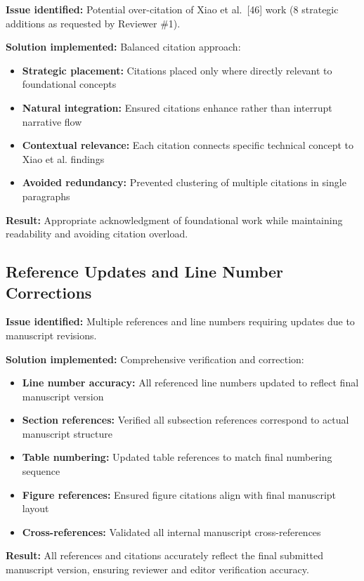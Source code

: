 \documentclass[11pt,a4paper]{article}
\begin{document}
\textbf{Issue identified:} Potential over-citation of Xiao et al.~[46] work (8 strategic additions as requested by Reviewer \#1).

\textbf{Solution implemented:} Balanced citation approach:
\begin{itemize}
    \item \textbf{Strategic placement:} Citations placed only where directly relevant to foundational concepts
    \item \textbf{Natural integration:} Ensured citations enhance rather than interrupt narrative flow
    \item \textbf{Contextual relevance:} Each citation connects specific technical concept to Xiao et al. findings
    \item \textbf{Avoided redundancy:} Prevented clustering of multiple citations in single paragraphs
\end{itemize}

\textbf{Result:} Appropriate acknowledgment of foundational work while maintaining readability and avoiding citation overload.

\subsection*{Reference Updates and Line Number Corrections}

\textbf{Issue identified:} Multiple references and line numbers requiring updates due to manuscript revisions.

\textbf{Solution implemented:} Comprehensive verification and correction:
\begin{itemize}
    \item \textbf{Line number accuracy:} All referenced line numbers updated to reflect final manuscript version
    \item \textbf{Section references:} Verified all subsection references correspond to actual manuscript structure
    \item \textbf{Table numbering:} Updated table references to match final numbering sequence
    \item \textbf{Figure references:} Ensured figure citations align with final manuscript layout
    \item \textbf{Cross-references:} Validated all internal manuscript cross-references
\end{itemize}

\textbf{Result:} All references and citations accurately reflect the final submitted manuscript version, ensuring reviewer and editor verification accuracy.
\end{document}
